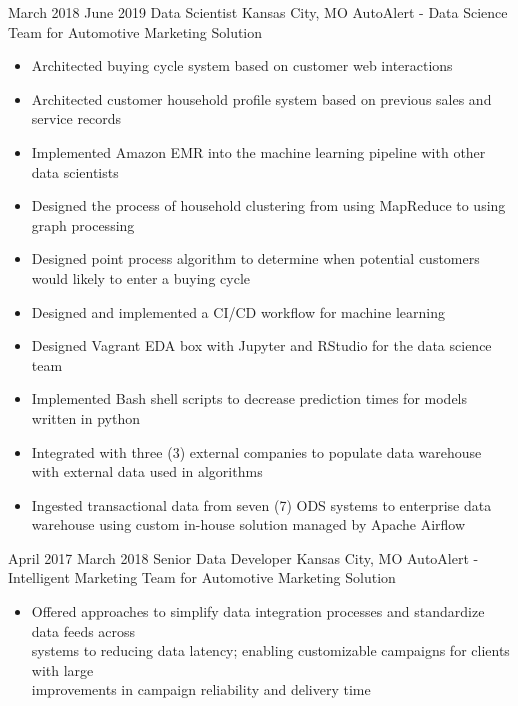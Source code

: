 \vspace*{0.05 in}

\ProjectExperience
{March 2018}
{June 2019}
{Data Scientist}
{Kansas City, MO}
{AutoAlert - Data Science Team for Automotive Marketing Solution}
{\begin{itemize}
    \item Architected buying cycle system based on customer web interactions
    \item Architected customer household profile system based on previous sales and service
    records
    \item Implemented Amazon EMR into the machine learning pipeline with other data scientists
\end{itemize}}
{\begin{itemize}
    \item Designed the process of household clustering from using MapReduce to using graph
    processing
    \item Designed point process algorithm to determine when potential customers would likely to
    enter a buying cycle
    \item Designed and implemented a CI/CD workflow for machine learning
    \item Designed Vagrant EDA box with Jupyter and RStudio for the data science team
\end{itemize}}
{\begin{itemize}
    \item Implemented Bash shell scripts to decrease prediction times for models written in python
    \item Integrated with three (3) external companies to populate data warehouse with external
    data used in algorithms
    \item Ingested transactional data from seven (7) ODS systems to enterprise data warehouse using
    custom in-house solution managed by Apache Airflow
\end{itemize}}

\vspace*{0.05 in}

\ProjectExperienceOneSection
{April 2017}
{March 2018}
{Senior Data Developer}
{Kansas City, MO}
{AutoAlert - Intelligent Marketing Team for Automotive Marketing Solution}
{\begin{itemize}
    \item Offered approaches to simplify data integration processes and standardize data feeds
    across \\systems to reducing data latency; enabling customizable campaigns for clients with
    large \\improvements in campaign reliability and delivery time
\end{itemize}}
